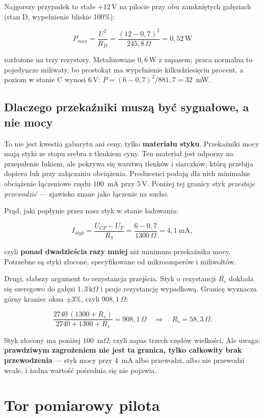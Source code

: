 \documentclass[a4paper,11pt]{article}
\newcommand{\ohm}{\,\Omega}
\newcommand{\kohm}{\,\mathrm{k}\Omega}
\newcommand{\volt}{\,\mathrm{V}}
\newcommand{\watt}{\,\mathrm{W}}
\begin{document}
Najgorszy przypadek to stałe $+12\volt$ na pilocie przy obu zamkniętych gałęziach
(stan D, wypełnienie bliskie 100\%):

\[
P_{max}=\frac{U^2}{R_{D}}=\frac{(12-0{,}7)^2}{245{,}8\ohm}=0{,}52\watt
\]

rozłożone na trzy rezystory. Metalizowane $0{,}6\watt$ z zapasem; praca normalna to
pojedyncze miliwaty, bo prostokąt ma wypełnienie kilkudziesięciu procent, a poziom
w stanie C wynosi $6\volt$:
$P = (6-0{,}7)^2/881{,}7 = 32$~mW.

\subsection{Dlaczego przekaźniki muszą być sygnałowe, a nie mocy}
\label{sec:przekazniki}

To nie jest kwestia gabarytu ani ceny, tylko \textbf{materiału styku}. Przekaźniki
mocy mają styki ze stopu srebra z tlenkiem cyny. Ten materiał jest odporny na
przepalenie łukiem, ale pokrywa się warstwą tlenków i siarczków, którą przebija
dopiero łuk przy załączaniu obciążenia. Producenci podają dla nich minimalne
obciążenie łączeniowe rzędu $100$~mA przy $5\volt$. Poniżej tej granicy styk
\emph{przestaje przewodzić} --- zjawisko znane jako łączenie na sucho.

Prąd, jaki popłynie przez nasz styk w stanie ładowania:

\[
I_{styk}=\frac{U_{CP}-U_{F}}{R_3}=\frac{6-0{,}7}{1300\ohm}=4{,}1\ \mathrm{mA},
\]

czyli \textbf{ponad dwadzieścia razy mniej} niż minimum przekaźnika mocy. Potrzebne
są styki złocone, specyfikowane od mikroamperów i miliwoltów.

Drugi, słabszy argument to rezystancja przejścia. Styk o rezystancji $R_s$ dokłada
się szeregowo do gałęzi $1{,}3\kohm$ i psuje rezystancję wypadkową. Granicę
wyznacza górny kraniec okna $\pm3\%$, czyli $908{,}1\ohm$:

\[
\frac{2740\,(1300+R_s)}{2740+1300+R_s}=908{,}1\ohm
\quad\Longrightarrow\quad
R_s = 58{,}3\ohm .
\]

Styk złocony ma poniżej $100$~m$\Omega$, czyli zapas trzech rzędów wielkości. Ale
uwaga: \textbf{prawdziwym zagrożeniem nie jest ta granica, tylko całkowity brak
przewodzenia} --- styk mocy przy $4$~mA albo przewodzi, albo nie przewodzi wcale,
i żadna wartość pośrednia się nie pojawia.

\section{Tor pomiarowy pilota}
\label{sec:pomiar}
\end{document}
